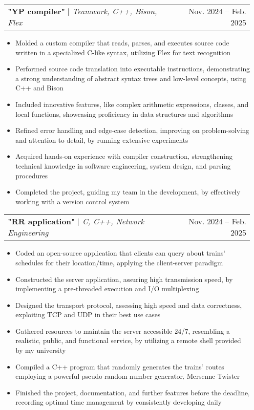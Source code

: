 \documentclass[letterpaper,11pt]{article}
\makeatletter
\newcommand{\resumeItem}[1]{
  \item\small{
    {#1 \vspace{-2pt}}
  }
}
\newcommand{\resumeProjectHeading}[2]{
    \item
    \begin{tabular*}{0.97\textwidth}{l@{\extracolsep{\fill}}r}
      \small#1 & #2 \\
    \end{tabular*}\vspace{-7pt}
}
\newcommand{\resumeItemListStart}{\begin{itemize}}
\newcommand{\resumeItemListEnd}{\end{itemize}\vspace{-5pt}}
\makeatother
\begin{document}
    \resumeProjectHeading
    {\textbf{"YP compiler"} $|$ \emph{Teamwork, C++, Bison, Flex}}{Nov. 2024 -- Feb. 2025}
      \resumeItemListStart
        \resumeItem{Molded a custom compiler that reads, parses, and executes source code written in a specialized C-like syntax, utilizing Flex for text recognition}
        \resumeItem{Performed source code translation into executable instructions, demonstrating a strong understanding of abstract syntax trees and low-level concepts, using C++ and Bison}
        \resumeItem{Included innovative features, like complex arithmetic expressions, classes, and local functions, showcasing proficiency in data structures and algorithms}
        \resumeItem{Refined error handling and edge-case detection, improving on problem-solving and attention to detail, by running extensive experiments}
        \resumeItem{Acquired hands-on experience with compiler construction, strengthening technical knowledge in software engineering, system design, and parsing procedures}
        \resumeItem{Completed the project, guiding my team in the development, by effectively working with a version control system}
    \resumeItemListEnd

    \resumeProjectHeading
    {\textbf{"RR application"} $|$ \emph{C, C++, Network Engineering}}{Nov. 2024 -- Feb. 2025}
    \resumeItemListStart
      \resumeItem{Coded an open-source application that clients can query about trains’ schedules for their location/time, applying the client-server paradigm}
      \resumeItem{Constructed the server application, assuring high transmission speed, by implementing a pre-threaded execution and I/O multiplexing}
      \resumeItem{Designed the transport protocol, assessing high speed and data correctness, exploiting TCP and UDP in their best use cases}
      \resumeItem{Gathered resources to maintain the server accessible 24/7, resembling a realistic, public, and functional service, by utilizing a remote shell provided by my university}
      \resumeItem{Compiled a C++ program that randomly generates the trains’ routes employing a powerful pseudo-random number generator, Mersenne Twister}
      \resumeItem{Finished the project, documentation, and further features before the deadline, recording optimal time management by consistently developing daily}
    \resumeItemListEnd
    
\end{document}
